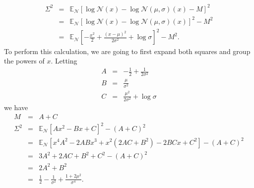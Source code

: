 \documentclass[12pt]{article}
\newcommand{\E}{\mathbb{E}}
\newcommand{\N}{\mathcal{N}}
\begin{document}
\begin{eqnarray*}
 \Sigma^2 & = & \E_\N\left[ \log \N(x) - \log \N(\mu,\sigma)(x) - M \right]^2 \\
 & = & \E_\N \left[ \log \N(x) - \log \N(\mu,\sigma)(x) \right]^2 - M^2 \\
 & = & \E_\N \left[ -\frac{x^2}{2} + \frac{(x-\mu)^2}{2\sigma^2} + \log \sigma \right]^2 - M^2.
\end{eqnarray*}
To perform this calculation, we are going to first expand both squares
and group the powers of $x$.  Letting
\begin{eqnarray*}
 A & = & -\frac{1}{2} + \frac{1}{2 \sigma^2} \\
 B & = & \frac{\mu}{\sigma^2} \\
 C & = & \frac{\mu^2}{2\sigma^2} + \log \sigma
\end{eqnarray*}
we have
\begin{eqnarray*}
 M & = & A + C \\
 \Sigma^2 & = & \E_\N \left[ A x^2 - B x + C \right] ^2 - (A + C)^2 \\
 & = & \E_\N \left[ x^4 A^2 - 2 A B x^3 + x^2 \left(2AC + B^2\right) - 2 B C x + C^2 \right] - (A+C)^2 \\
 & = & 3A^2 + 2AC + B^2 + C^2 - (A+C)^2 \\
 & = & 2A^2 + B^2 \\
 & = & \frac{1}{2} - \frac{1}{\sigma^2} + \frac{1 + 2\mu^2}{\sigma^4}.
\end{eqnarray*}
\end{document}
